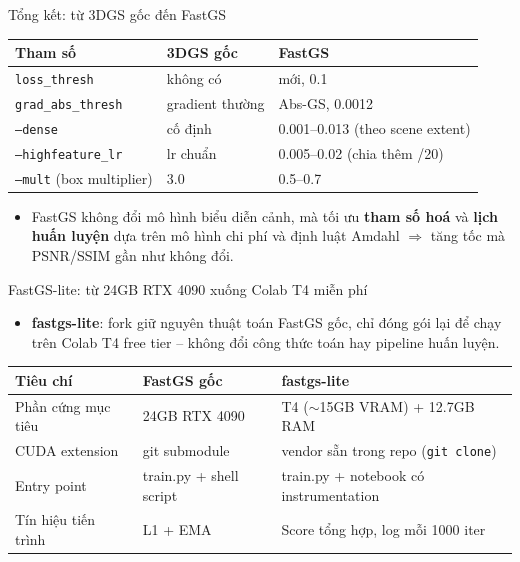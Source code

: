 
\begin{frame}{Tổng kết: từ 3DGS gốc đến FastGS}
\centering
\footnotesize
\begin{tabular}{lll}
\toprule
\textbf{Tham số} & \textbf{3DGS gốc} & \textbf{FastGS} \\
\midrule
\texttt{loss\_thresh} & không có & mới, 0.1 \\
\texttt{grad\_abs\_thresh} & gradient thường & Abs-GS, 0.0012 \\
\texttt{--dense} & cố định & 0.001--0.013 (theo scene extent) \\
\texttt{--highfeature\_lr} & lr chuẩn & 0.005--0.02 (chia thêm /20) \\
\texttt{--mult} (box multiplier) & 3.0 & 0.5--0.7 \\
\bottomrule
\end{tabular}
\vspace{0.4cm}
\begin{itemize}
    \item FastGS không đổi mô hình biểu diễn cảnh, mà tối ưu \textbf{tham số hoá} và \textbf{lịch huấn luyện} dựa trên mô hình chi phí và định luật Amdahl $\Rightarrow$ tăng tốc mà PSNR/SSIM gần như không đổi.
\end{itemize}
\end{frame}

\begin{frame}{FastGS-lite: từ 24GB RTX 4090 xuống Colab T4 miễn phí}
\begin{itemize}
    \item \textbf{fastgs-lite}: fork giữ nguyên thuật toán FastGS gốc, chỉ đóng gói lại để chạy trên Colab T4 free tier -- không đổi công thức toán hay pipeline huấn luyện.
\end{itemize}
\vspace{0.3em}
\footnotesize
\begin{table}
\centering
\begin{tabular}{lll}
\toprule
\textbf{Tiêu chí} & \textbf{FastGS gốc} & \textbf{fastgs-lite} \\
\midrule
Phần cứng mục tiêu & 24GB RTX 4090 & T4 ($\sim$15GB VRAM) + 12.7GB RAM \\
CUDA extension & git submodule & vendor sẵn trong repo (\texttt{git clone}) \\
Entry point & train.py + shell script & train.py + notebook có instrumentation \\
Tín hiệu tiến trình & L1 + EMA & Score tổng hợp, log mỗi 1000 iter \\
\bottomrule
\end{tabular}
\end{table}
\end{frame}

